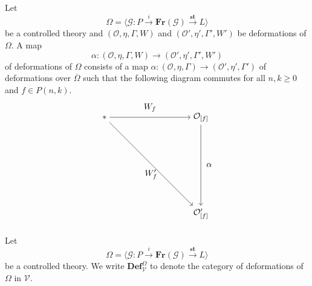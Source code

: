 \documentclass{tac}
\begin{document}

\begin{definition}
    Let
\[
\Omega=\langle \mathcal{G}:P\xrightarrow{i}\mathbf{Fr}(\mathcal{G})\xrightarrow{\mathbf{st}}L\rangle
\]
be a controlled theory and $(\mathcal{O},\eta,\Gamma, W)$ and $(\mathcal{O}',\eta',\Gamma',W')$ be deformations of $\Omega$. A map 
\[
\alpha:(\mathcal{O},\eta,\Gamma,W)\to (\mathcal{O}',\eta',\Gamma',W')
\]
of deformations of $\Omega$ consists of a map $\alpha:(\mathcal{O},\eta,\Gamma)\to (\mathcal{O}',\eta',\Gamma')$ of deformations over $\overline{\Omega}$ such that the following diagram commutes for all $n,k\geq 0 $ and $f\in P(n,k)$.
\[
  \begin{tikzpicture}[node distance=4cm, auto]
        \node (A) {$*$};
       \node (C)[right of=A]{$\mathcal{O}_{[f]}$};
       \node (D)[below of=C]{$\mathcal{O}'_{[f]}$};
       \draw[->] (A) to node[above=3]{$W_f$}(C);
       \draw[->](C) to node[right=3]{$\alpha$}(D);
       \draw[->](A) to node[below=3]{$W'_f$} (D);
    \end{tikzpicture}
\]
\end{definition}

\begin{notation}
Let
\[
\Omega=\langle \mathcal{G}:P\xrightarrow{i}\mathbf{Fr}(\mathcal{G})\xrightarrow{\mathbf{st}}L\rangle
\]
be a controlled theory. We write $\mathbf{Def}^{\Omega}_\mathcal{V}$ to denote the category of deformations of $\Omega$ in $\mathcal{V}$.
\end{notation}
\end{document}
